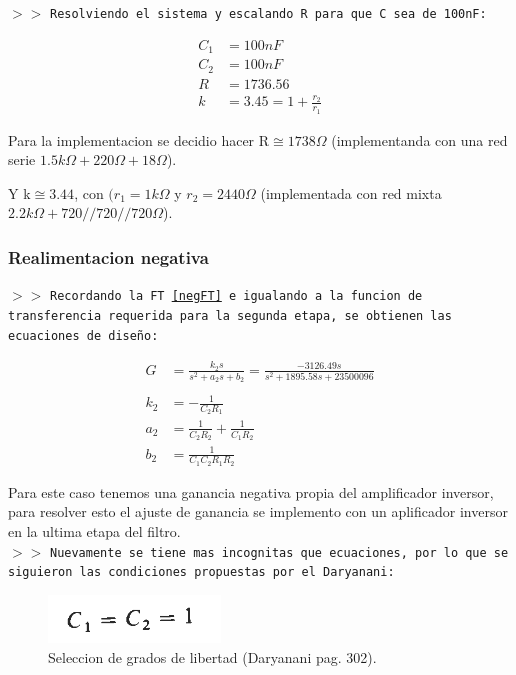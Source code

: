 \noindent $>>$ \texttt{Resolviendo el sistema y escalando R para que C sea de 100nF:}

\begin{align*}
    C_{1} &= 100 nF \\
    C_{2} &= 100 nF \\
    R &= 1736.56 \\
    k &= 3.45 = 1+\frac{r_2}{r_1}
\end{align*}

Para la implementacion se decidio hacer R$\cong 1738 \Omega$ (implementanda con una red serie $1.5k\Omega+220\Omega+18\Omega$).

Y k$\cong 3.44$, con $(r_{1}=1k\Omega$ y $r_2=2440\Omega$ (implementada con red mixta $2.2k\Omega+720//720//720\Omega$).

\subsubsection{Realimentacion negativa}

\noindent $>>$ \texttt{Recordando la FT \ref{negFT} e igualando a la funcion de transferencia requerida para la segunda etapa, se obtienen las ecuaciones de diseño:}

\begin{align*}
    G &= \frac{k_2 s}{s^{2} + a_2 s + b_2} = \frac{-3126.49 s}{s^{2} + 1895.58 s + 23500096} \\\\
    k_2 &= -\frac{1}{C_{2} R_{1}} \\
    a_2 &= \frac{1}{C_{2} R_{2}} + \frac{1}{C_{1} R_{2}} \\
    b_2 &= \frac{1}{C_{1} C_{2} R_{1} R_{2}}
\end{align*}

Para este caso tenemos una ganancia negativa propia del amplificador inversor, para resolver esto el ajuste de ganancia se implemento con un aplificador inversor en la ultima etapa del filtro. \\

\noindent $>>$ \texttt{Nuevamente se tiene mas incognitas que ecuaciones, por lo que se siguieron las condiciones propuestas por el Daryanani:}

\begin{figure}[H]
    \centering
    \includegraphics[scale=.8]{Secciones/Circ1/img/daryanani302.png}
    \caption{Seleccion de grados de libertad (Daryanani pag. 302).}
    \label{pv1}
\end{figure}

